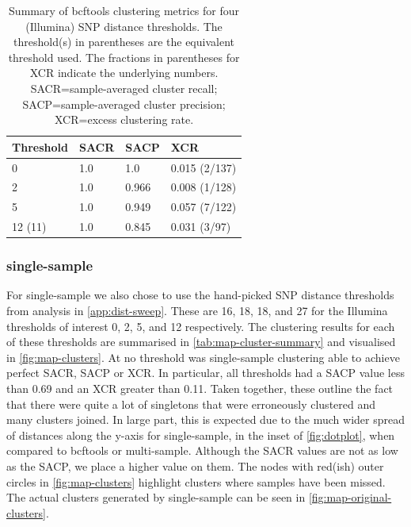 \begin{table}
\centering
\begin{tabular}{llll}
Threshold & SACR & SACP  & XCR           \\
\hline
0         & 1.0  & 1.0   & 0.015 (2/137) \\
\hline
2         & 1.0  & 0.966 & 0.008 (1/128) \\
\hline
5         & 1.0  & 0.949 & 0.057 (7/122) \\
\hline
12 (11)       & 1.0  & 0.845 & 0.031 (3/97) 
\end{tabular}
\caption{Summary of bcftools clustering metrics for four (Illumina) SNP distance thresholds. The threshold(s) in parentheses are the \ont{} equivalent threshold used. The fractions in parentheses for XCR indicate the underlying numbers. SACR=sample-averaged cluster recall; SACP=sample-averaged cluster precision; XCR=excess clustering rate.}
\label{tab:bcftools-cluster-summary}
\end{table}

\subsubsection{\pandora{} single-sample}

For \pandora{} single-sample we also chose to use the hand-picked SNP distance thresholds from analysis in \autoref{app:dist-sweep}. These are 16, 18, 18, and 27 for the Illumina thresholds of interest 0, 2, 5, and 12 respectively. The clustering results for each of these thresholds are summarised in \autoref{tab:map-cluster-summary} and visualised in \autoref{fig:map-clusters}. At no threshold was \pandora{} single-sample clustering able to achieve perfect SACR, SACP or XCR. In particular, all thresholds had a SACP value less than 0.69 and an XCR greater than 0.11. Taken together, these outline the fact that there were quite a lot of singletons that were erroneously clustered and many clusters joined. In large part, this is expected due to the much wider spread of distances along the y-axis for \pandora{} single-sample, in the inset of \autoref{fig:dotplot}, when compared to bcftools or \pandora{} multi-sample. Although the SACR values are not as low as the SACP, we place a higher value on them. The nodes with red(ish) outer circles in \autoref{fig:map-clusters} highlight clusters where samples have been missed. The actual clusters generated by \pandora{} single-sample can be seen in \autoref{fig:map-original-clusters}.

